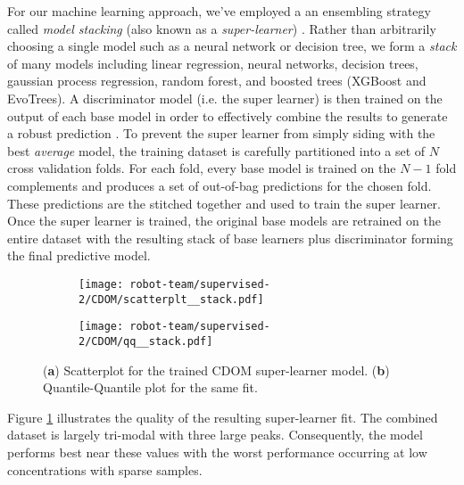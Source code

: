For our machine learning approach, we've employed a an ensembling strategy called \textit{model stacking} (also known as a \textit{super-learner}) \cite{ModelStacking}. Rather than arbitrarily choosing a single model such as a neural network or decision tree, we form a \textit{stack} of many models including linear regression, neural networks, decision trees, gaussian process regression, random forest, and boosted trees (XGBoost and EvoTrees). A discriminator model (i.e. the super learner) is then trained on the output of each base model in order to effectively combine the results to generate a robust prediction \cite{ModelStacking}. To prevent the super learner from simply siding with the best \textit{average} model, the training dataset is carefully partitioned into a set of $N$ cross validation folds. For each fold, every base model is trained on the $N-1$ fold complements and produces a set of out-of-bag predictions for the chosen fold. These predictions are the stitched together and used to train the super learner. Once the super learner is trained, the original base models are retrained on the entire dataset with the resulting stack of base learners plus discriminator forming the final predictive model.

\begin{figure}[!hbt]
  \begin{subfigure}{0.5\textwidth}
    \centering
    \texttt{[image: robot-team/supervised-2/CDOM/scatterplt\_\_stack.pdf]}
  \end{subfigure}
  \begin{subfigure}{0.5\textwidth}
    \centering
    \texttt{[image: robot-team/supervised-2/CDOM/qq\_\_stack.pdf]}
  \end{subfigure}
  \caption{(\textbf{a}) Scatterplot for the trained CDOM super-learner model. (\textbf{b}) Quantile-Quantile plot for the same fit.}
  \label{fig:CDOM_fitresult}
\end{figure}

Figure \ref{fig:CDOM_fitresult} illustrates the quality of the resulting super-learner fit. The combined dataset is largely tri-modal with three large peaks. Consequently, the model performs best near these values with the worst performance occurring at low concentrations with sparse samples.

